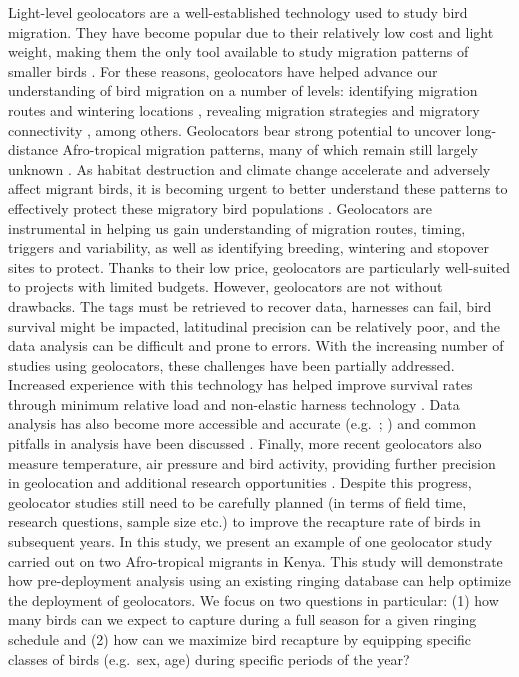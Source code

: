 \documentclass[]{interact}
\theoremstyle{plain}%
\theoremstyle{definition}
\theoremstyle{remark}
\begin{document}
Light-level geolocators are a well-established technology used to study
bird migration. They have become popular due to their relatively low
cost and light weight, making them the only tool available to study
migration patterns of smaller birds \citep{Bridge2011}. For these
reasons, geolocators have helped advance our understanding of bird
migration on a number of levels: identifying migration routes and
wintering locations
\citep[e.g.~][]{Salewski2013, Smith2014, Liechti2015, Kralj2020},
revealing migration strategies
\citep[e.g.~][]{Adamik2016, Briedis2019, Hahn2020} and migratory
connectivity \citep[e.g.~][]{Finch2015, Prochazka2017, McKinnon2018a},
among others. Geolocators bear strong potential to uncover long-distance
Afro-tropical migration patterns, many of which remain still largely
unknown
\citep[e.g.~][]{Benson1982, Bennun2000, Cox2011, Bussiere2015, Nwaogu2016, Osinubi2018}.
As habitat destruction and climate change accelerate and adversely
affect migrant birds, it is becoming urgent to better understand these
patterns to effectively protect these migratory bird populations
\citep[e.g.~][]{Simmons2004, Sekercioglu2010, Sekercioglu2012, Vickery2014}.
Geolocators are instrumental in helping us gain understanding of
migration routes, timing, triggers and variability, as well as
identifying breeding, wintering and stopover sites to protect. Thanks to
their low price, geolocators are particularly well-suited to projects
with limited budgets. However, geolocators are not without drawbacks.
The tags must be retrieved to recover data, harnesses can fail, bird
survival might be impacted, latitudinal precision can be relatively
poor, and the data analysis can be difficult and prone to errors. With
the increasing number of studies using geolocators, these challenges
have been partially addressed. Increased experience with this technology
has helped improve survival rates through minimum relative load and
non-elastic harness technology
\citep[e.g.~][]{Streby2015, Weiser2015, Brlik2020}. Data analysis has
also become more accessible and accurate (e.g.~\citet{Lisovski2012};
\citet{Lisovski2020}) and common pitfalls in analysis have been
discussed \citep[e.g.~][]{Fudickar2012, Lisovski2012, Lisovski2018}.
Finally, more recent geolocators also measure temperature, air pressure
and bird activity, providing further precision in geolocation and
additional research opportunities
\citep[e.g.~][]{Meier2018, Liechti2018, Dhanjal-Adams2018, Sjoberg2018, Jiguet2019, Briedis2020}.
Despite this progress, geolocator studies still need to be carefully
planned (in terms of field time, research questions, sample size etc.)
to improve the recapture rate of birds in subsequent years. In this
study, we present an example of one geolocator study carried out on two
Afro-tropical migrants in Kenya. This study will demonstrate how
pre-deployment analysis using an existing ringing database can help
optimize the deployment of geolocators. We focus on two questions in
particular: (1) how many birds can we expect to capture during a full
season for a given ringing schedule and (2) how can we maximize bird
recapture by equipping specific classes of birds (e.g.~sex, age) during
specific periods of the year?
\end{document}
